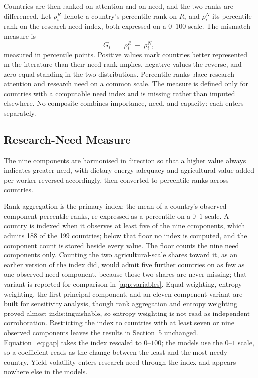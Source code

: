 \documentclass[ASNA,twocolumn]{USG}
\begin{document}
Countries are then ranked on attention and on need, and the two ranks are differenced. Let
$\rho^{R}_{i}$ denote a country's percentile rank on $R_{i}$ and $\rho^{N}_{i}$ its percentile
rank on the research-need index, both expressed on a $0$--$100$ scale. The mismatch measure is
\begin{equation}
G_{i} \;=\; \rho^{R}_{i} \;-\; \rho^{N}_{i},
\label{eq:gap}
\end{equation}
measured in percentile points. Positive values mark countries better represented in the
literature than their need rank implies, negative values the reverse, and zero equal standing
in the two distributions. Percentile ranks place research attention and research need on a common scale. The measure
is defined only for countries with a computable need index and is missing rather than imputed
elsewhere. No composite combines importance, need, and capacity: each enters separately.

\subsection{Research-Need Measure}

The nine components are harmonised in direction so that a higher value always indicates
greater need, with dietary energy adequacy and agricultural value added per worker reversed
accordingly, then converted to percentile ranks across countries.

Rank aggregation is the primary index: the mean of a country's observed component percentile
ranks, re-expressed as a percentile on a $0$--$1$ scale. A country is indexed when it observes at
least five of the nine components, which admits 188 of the 199 countries; below that floor no
index is computed, and the component count is stored beside every value. The floor counts the
nine need components only. Counting the two agricultural-scale shares toward it, as an earlier
version of the index did, would admit five further countries on as few as one observed need
component, because those two shares are never missing; that variant is reported for comparison
in \ref{app:variables}. Equal weighting, entropy weighting, the first principal component, and
an eleven-component variant are built for sensitivity analysis, though rank aggregation and
entropy weighting proved almost indistinguishable, so entropy weighting is not read as
independent corroboration. Restricting the index to countries with at least seven or nine
observed components leaves the results in Section~5 unchanged. Equation~\eqref{eq:gap} takes the index rescaled to $0$--$100$; the
models use the $0$--$1$ scale, so a coefficient reads as the change between the least and the
most needy country. Yield volatility enters research need through the index and appears
nowhere else in the models.
\end{document}
